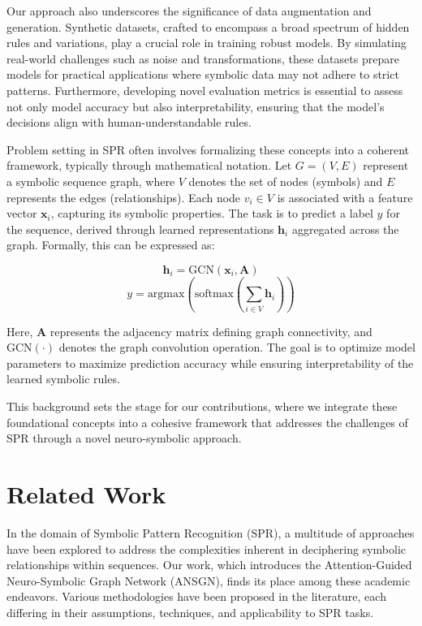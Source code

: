\documentclass{article}
\begin{document}
Our approach also underscores the significance of data augmentation and generation. Synthetic datasets, crafted to encompass a broad spectrum of hidden rules and variations, play a crucial role in training robust models. By simulating real-world challenges such as noise and transformations, these datasets prepare models for practical applications where symbolic data may not adhere to strict patterns. Furthermore, developing novel evaluation metrics is essential to assess not only model accuracy but also interpretability, ensuring that the model's decisions align with human-understandable rules.

Problem setting in SPR often involves formalizing these concepts into a coherent framework, typically through mathematical notation. Let \( G = (V, E) \) represent a symbolic sequence graph, where \( V \) denotes the set of nodes (symbols) and \( E \) represents the edges (relationships). Each node \( v_i \in V \) is associated with a feature vector \( \mathbf{x}_i \), capturing its symbolic properties. The task is to predict a label \( y \) for the sequence, derived through learned representations \( \mathbf{h}_i \) aggregated across the graph. Formally, this can be expressed as:

\[ \mathbf{h}_i = \text{GCN}(\mathbf{x}_i, \mathbf{A}) \]
\[ y = \text{argmax}(\text{softmax}(\sum_{i \in V} \mathbf{h}_i)) \]

Here, \(\mathbf{A}\) represents the adjacency matrix defining graph connectivity, and \(\text{GCN}(\cdot)\) denotes the graph convolution operation. The goal is to optimize model parameters to maximize prediction accuracy while ensuring interpretability of the learned symbolic rules.

This background sets the stage for our contributions, where we integrate these foundational concepts into a cohesive framework that addresses the challenges of SPR through a novel neuro-symbolic approach.

\section{Related Work}
In the domain of Symbolic Pattern Recognition (SPR), a multitude of approaches have been explored to address the complexities inherent in deciphering symbolic relationships within sequences. Our work, which introduces the Attention-Guided Neuro-Symbolic Graph Network (ANSGN), finds its place among these academic endeavors. Various methodologies have been proposed in the literature, each differing in their assumptions, techniques, and applicability to SPR tasks.
\end{document}
